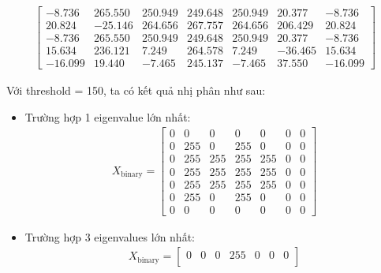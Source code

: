 \begin{itemize}
\begin{itemize}
\begin{align*}
\begin{bmatrix}
                                -8.736 & 265.550 & 250.949 & 249.648 & 250.949 & 20.377 & -8.736 \\
                                20.824 & -25.146 & 264.656 & 267.757 & 264.656 & 206.429 & 20.824 \\
                                -8.736 & 265.550 & 250.949 & 249.648 & 250.949 & 20.377 & -8.736 \\
                                15.634 & 236.121 & 7.249 & 264.578 & 7.249 & -36.465 & 15.634 \\
                                -16.099 & 19.440 & -7.465 & 245.137 & -7.465 & 37.550 & -16.099
                                \end{bmatrix}
                            \end{align*}
                    \end{itemize}
                    Với threshold = 150, ta có kết quả nhị phân như sau:
                    \begin{itemize}
                        \item Trường hợp 1 eigenvalue lớn nhất:
                            \begin{align*}
                                X_{\text{binary}} = \begin{bmatrix}
                                0 & 0 & 0 & 0 & 0 & 0 & 0 \\
                                0 & 255 & 0 & 255 & 0 & 0 & 0 \\
                                0 & 255 & 255 & 255 & 255 & 0 & 0 \\
                                0 & 255 & 255 & 255 & 255 & 0 & 0 \\
                                0 & 255 & 255 & 255 & 255 & 0 & 0 \\
                                0 & 255 & 0 & 255 & 0 & 0 & 0 \\
                                0 & 0 & 0 & 0 & 0 & 0 & 0
                                \end{bmatrix}
                            \end{align*}
                        \item Trường hợp 3 eigenvalues lớn nhất:
                            \begin{align*}
                                X_{\text{binary}} = \begin{bmatrix}
                                0 & 0 & 0 & 255 & 0 & 0 & 0 \\

\end{bmatrix}
\end{align*}
\end{itemize}
\end{itemize}
